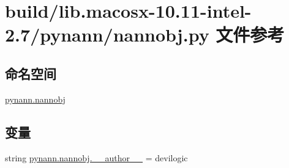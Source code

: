 \hypertarget{build_2lib_8macosx-10_811-intel-2_87_2pynann_2nannobj_8py}{}\section{build/lib.macosx-\/10.11-\/intel-\/2.7/pynann/nannobj.py 文件参考}
\label{build_2lib_8macosx-10_811-intel-2_87_2pynann_2nannobj_8py}
\subsection*{命名空间}
\begin{DoxyCompactItemize}
\item 
 \hyperlink{namespacepynann_1_1nannobj}{pynann.\+nannobj}
\end{DoxyCompactItemize}
\subsection*{变量}
\begin{DoxyCompactItemize}
\item 
string \hyperlink{namespacepynann_1_1nannobj_a60a69ee36c7aefb2074e46206cd7a52d}{pynann.\+nannobj.\+\_\+\+\_\+author\+\_\+\+\_\+} = \textquotesingle{}devilogic\textquotesingle{}
\end{DoxyCompactItemize}
